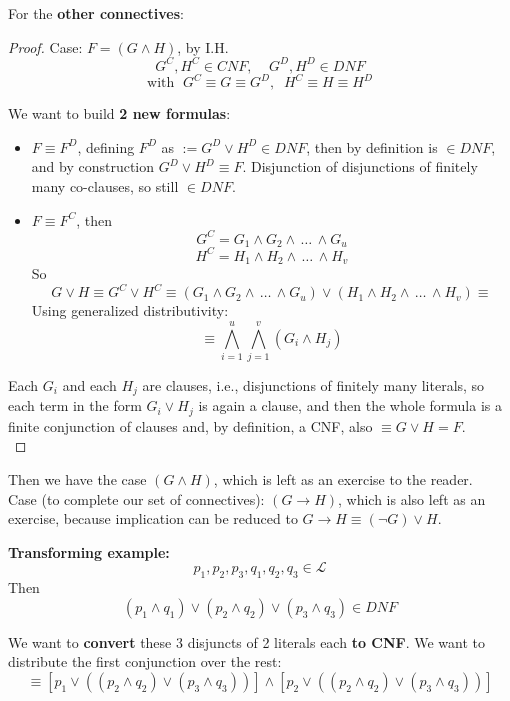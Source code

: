 \documentclass[11pt]{article}
\begin{document}
	For the \textbf{other connectives}: \begin{proof}
		Case: $F = (G \wedge H)$, by I.H.
		$$  G^C, H^C \in CNF, \;\;\;\; G^D, H^D \in DNF $$
		$$ \text{with } \; G^C \equiv G \equiv G^D, \;\; H^C \equiv H \equiv H^D $$
		
		We want to build \textbf{2 new formulas}:
		\begin{itemize}
			\item $F \equiv F^D$, defining $F^D$ as  $:= G^D \vee H^D \in DNF$, then by definition is $ \in DNF$, and by construction $G^D \vee H^D \equiv F$. Disjunction of disjunctions of finitely many co-clauses, so still $\in DNF$.\\
			
			\item $F \equiv F^C$, then 
			$$ G^C = G_1 \wedge G_2 \wedge \, \dots \, \wedge G_u $$
			$$ H^C = H_1 \wedge H_2 \wedge \, \dots \, \wedge H_v $$
			So
			$$ G \vee H \equiv G^C \vee H^C \equiv (G_1 \wedge G_2 \wedge \, \dots \, \wedge G_u) \vee (H_1 \wedge H_2 \wedge \, \dots \, \wedge H_v) \equiv $$
			Using generalized distributivity:
			$$ \equiv \bigwedge_{i=1}^u \bigwedge_{j=1}^v (G_i \wedge H_j) $$
		\end{itemize}
		
		
		Each $G_i$ and each $H_j$ are clauses, i.e., disjunctions of finitely many literals, so each term in the form $G_i \vee H_j$ is again a clause, and then the whole formula is a finite conjunction of clauses and, by definition, a CNF, also $\equiv G \vee H = F$.\\
	\end{proof}
	
	Then we have the case $(G \wedge H)$, which is left as an exercise to the reader.\\
	
	Case (to complete our set of connectives): $(G \rightarrow H)$, which is also left as an exercise, because implication can be reduced to $G \rightarrow H \equiv (\neg G) \vee H$.\\
	
	\newpage
	
	\textbf{Transforming example:} 
	$$ p_1, p_2, p_3, q_1, q_2, q_3 \in \mathcal{L}$$
	Then 
	$$ (p_1 \wedge q_1) \vee (p_2 \wedge q_2) \vee (p_3 \wedge q_3) \in DNF$$
	
	We want to \textbf{convert} these 3 disjuncts of 2 literals each \textbf{to CNF}. We want to distribute the first conjunction over the rest:
	$$ \equiv [p_1 \vee ((p_2 \wedge q_2) \vee (p_3 \wedge q_3))] \wedge [p_2 \vee ((p_2 \wedge q_2) \vee (p_3 \wedge q_3))] $$
	
\end{document}
